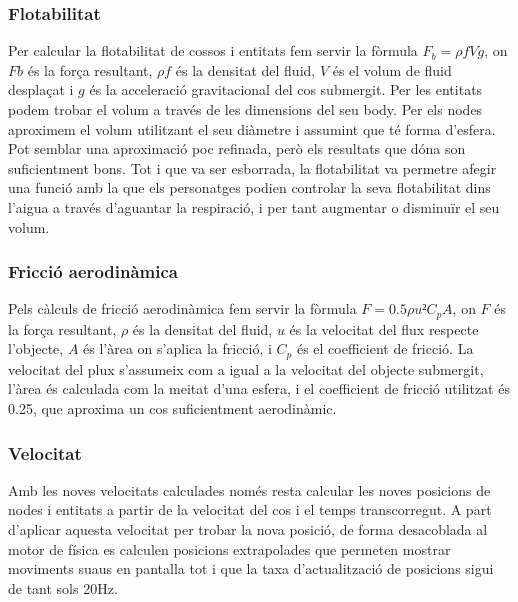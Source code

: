 \subsubsection{Flotabilitat}
Per calcular la flotabilitat de cossos i entitats fem servir la fòrmula $F_{b} = ρfVg$, on $Fb$ és la força resultant, $ρf$ és la densitat del fluid, $V$ és el volum de fluid desplaçat i $g$ és la acceleració gravitacional del cos submergit. Per les entitats podem trobar el volum a través de les dimensions del seu body. Per els nodes aproximem el volum utilitzant el seu diàmetre i assumint que té forma d'esfera.  Pot semblar una aproximació poc refinada, però els resultats que dóna son suficientment bons. Tot i que va ser esborrada, la flotabilitat va permetre afegir una funció amb la que els personatges podien controlar la seva flotabilitat dins l'aigua a través d'aguantar la respiració, i per tant augmentar o disminuïr el seu volum.
\subsubsection{Fricció aerodinàmica}
Pels càlculs de fricció aerodinàmica fem servir la fòrmula $F=0.5\rho u²C_{p}A$, on $F$ és la força resultant, $\rho$ és la densitat del fluid, $u$ és la velocitat del flux respecte l'objecte, $A$ és l'àrea on s'aplica la fricció, i $C_{p}$ és el coefficient de fricció. La velocitat del plux s'assumeix com a igual a la velocitat del objecte submergit, l'àrea és calculada com la meitat d'una esfera, i el coefficient de fricció utilitzat és 0.25, que aproxima un cos suficientment aerodinàmic.
\subsubsection{Velocitat}
Amb les noves velocitats calculades només resta calcular les noves posicions de nodes i entitats a partir de la velocitat del cos i el temps transcorregut. A part d'aplicar aquesta velocitat per trobar la nova posició, de forma desacoblada al motor de física es calculen posicions extrapolades que permeten mostrar moviments suaus en pantalla tot i que la taxa d'actualització de posicions sigui de tant sols 20Hz.
